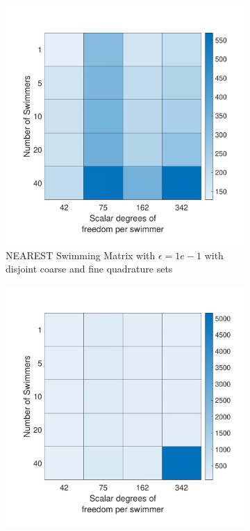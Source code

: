 \begin{figure}
\ContinuedFloat
    \begin{subfigure}{0.3\textwidth}
        \includegraphics[width=\linewidth]{Images/Condition/Mobility Matrix using Disjoint NEAREST-1.pdf}
        \caption{NEAREST Swimming Matrix with $\epsilon=1e-1$ with disjoint coarse and fine quadrature sets}        
    \end{subfigure}
    \begin{subfigure}{0.3\textwidth}
        \includegraphics[width=\linewidth]{Images/Condition/Mobility Matrix using Disjoint NEAREST-2.pdf}

\end{subfigure}
\end{figure}
